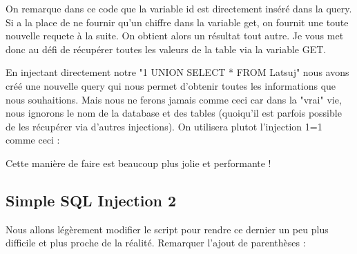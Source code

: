 \documentclass{article}
\begin{document}
On remarque dans ce code que la variable id est directement inséré dans la query. Si a la place de ne fournir qu'un chiffre dans la variable get, on fournit une toute nouvelle requete à la suite. On obtient alors un résultat tout autre. Je vous met donc au défi de récupérer toutes les valeurs de la table via la variable GET. 
\vspace{0.2cm}\\
\vspace{0.2cm}

En injectant directement notre "1 UNION SELECT * FROM Latsuj" nous avons créé une nouvelle query qui nous permet d'obtenir toutes les informations que nous souhaitions. Mais nous ne ferons jamais comme ceci car dans la "vrai" vie, nous ignorons le nom de la database et des tables (quoiqu'il est parfois possible de les récupérer via d'autres injections). On utilisera plutot l'injection 1=1 comme ceci :
\vspace{0.2cm}\\
\vspace{0.2cm}

Cette manière de faire est beaucoup plus jolie et performante !

\subsection{Simple SQL Injection 2}

Nous allons légèrement modifier le script pour rendre ce dernier un peu plus difficile et plus proche de la réalité. Remarquer l'ajout de parenthèses :
\vspace{0.2cm}\\
\vspace{0.2cm}
\end{document}
